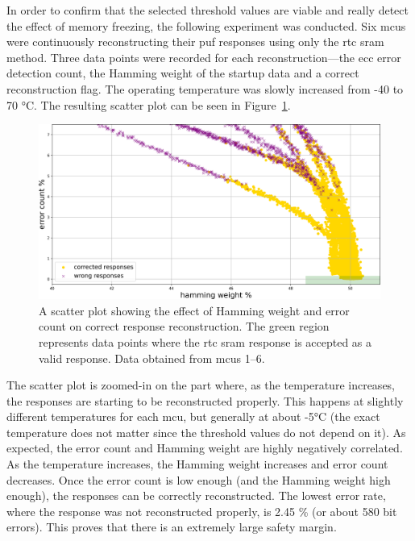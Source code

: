 In order to confirm that the selected threshold values are viable and really detect the effect of memory freezing, the following experiment was conducted. Six \glspl{mcu} were continuously reconstructing their \gls{puf} responses using only the \gls{rtc} \gls{sram} method. Three data points were recorded for each reconstruction---the \gls{ecc} error detection count, the Hamming weight of the startup data and a correct reconstruction flag. The operating temperature was slowly increased from -40 to 70 °C. The resulting scatter plot can be seen in Figure~\ref{fig:correct_responses_plot}.

\begin{figure}[ht!]
    \centering
    \captionsetup{margin=0.5cm}
    \includegraphics[width=\textwidth]{images/correct_responses_plot.png}
    \caption[A scatter plot showing the effect of Hamming weight and error count on correct response reconstruction]{A scatter plot showing the effect of Hamming weight and error count on correct response reconstruction. The green region represents data points where the \gls{rtc} \gls{sram} response is accepted as a valid response. Data obtained from \glspl{mcu} 1--6.}
    \label{fig:correct_responses_plot}
\end{figure}

The scatter plot is zoomed-in on the part where, as the temperature increases, the responses are starting to be reconstructed properly. This happens at slightly different temperatures for each \gls{mcu}, but generally at about -5°C (the exact temperature does not matter since the threshold values do not depend on it). As expected, the error count and Hamming weight are highly negatively correlated. As the temperature increases, the Hamming weight increases and error count decreases. Once the error count is low enough (and the Hamming weight high enough), the responses can be correctly reconstructed. The lowest error rate, where the response was not reconstructed properly, is 2.45 \% (or about 580 bit errors). This proves that there is an extremely large safety margin.

